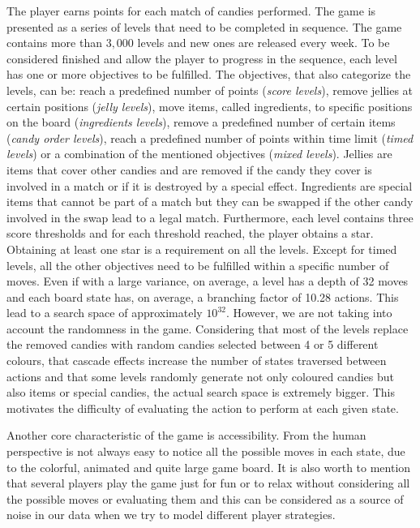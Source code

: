 The player earns points for each match of candies performed. The game is presented as a series of levels that need to be completed in sequence. The game contains more than $3,000$ levels and new ones are released every week. To be considered finished and allow the player to progress in the sequence, each level has one or more objectives to be fulfilled. The objectives, that also categorize the levels, can be: reach a predefined number of points (\textit{score levels}), remove jellies at certain positions (\textit{jelly levels}), move items, called ingredients, to specific positions on the board (\textit{ingredients levels}), remove a predefined number of certain items (\textit{candy order levels}), reach a predefined number of points within time limit (\textit{timed levels}) or a combination of the mentioned objectives (\textit{mixed levels}). Jellies are items that cover other candies and are removed if the candy they cover is involved in a match or if it is destroyed by a special effect. Ingredients are special items that cannot be part of a match but they can be swapped if the other candy involved in the swap lead to a legal match. Furthermore, each level contains three score thresholds and for each threshold reached, the player obtains a star. Obtaining at least one star is a requirement on all the levels. Except for timed levels, all the other objectives need to be fulfilled within a specific number of moves. Even if with a large variance, on average, a level has a depth of 32 moves and each board state has, on average, a branching factor of 10.28 actions. This lead to a search space of approximately $10^{32}$. However, we are not taking into account the randomness in the game. Considering that most of the levels replace the removed candies with random candies selected between 4 or 5 different colours, that cascade effects increase the number of states traversed between actions and that some levels randomly generate not only coloured candies but also items or special candies, the actual search space is extremely bigger.
This motivates the difficulty of evaluating the action to perform at each given state.

Another core characteristic of the game is accessibility. From the human perspective is not always easy to notice all the possible moves in each state, due to the colorful, animated and quite large game board. It is also worth to mention that several players play the game just for fun or to relax without considering all the possible moves or evaluating them and this can be considered as a source of noise in our data when we try to model different player strategies.

